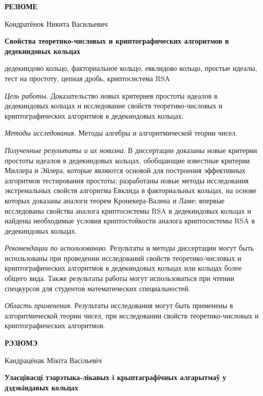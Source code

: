 \documentclass[_00_autoref.tex]{subfiles}
\begin{document}
\newpage
\centerline{\textbf{РЕЗЮМЕ}}

\vspace{-0.3ex}
\begin{center}
Кондратёнок Никита Васильевич

\textbf{Свойства теоретико-числовых и криптографических алгоритмов в дедекиндовых кольцах}
\end{center}
\vspace{-0.3ex}

\noindent
дедекиндово кольцо, факториальное кольцо, евклидово кольцо, простые идеалы, тест на простоту, цепная дробь, криптосистема RSA

\textit{Цель работы}.
Доказательство новых критериев простоты идеалов в дедекиндовых кольцах и исследование свойств теоретико-числовых и криптографических алгоритмов в дедекиндовых кольцах.

\textit{Методы исследования}.
Методы алгебры и алгоритмической теории чисел.

\textit{Полученные результаты и их новизна}.
В диссертации доказаны новые критерии простоты идеалов в дедекиндовых кольцах, обобщающие известные критерии Миллера и Эйлера, которые являются основой для построения эффективных алгоритмов тестирования простоты; разработаны новые методы исследования экстремальных свойств алгоритма Евклида в факториальных кольцах, на основе которых доказаны аналоги теорем Кронекера-Валена и Ламе; впервые исследованы свойства аналога криптосистемы RSA в дедекиндовых кольцах и найдены необходимые условия криптостойкости аналога криптосистемы RSA в дедекиндовых кольцах.

\textit{Рекомендации по использованию}.
Результаты и методы диссертации могут быть использованы при проведении исследований свойств теоретико-числовых и криптографических алгоритмов в дедекиндовых кольцах или кольцах более общего вида.
Также результаты работы могут использоваться при чтении спецкурсов для студентов математических специальностей.

\textit{Область применения}.
Результаты исследования могут быть применены в алгоритмической теории чисел, при исследовании свойств теоретико-числовых и криптографических алгоритмов.

\newpage
\centerline{\textbf{РЭЗЮМЭ}}

\vspace{-0.3ex}
\begin{center}
Кандрацёнак Мікіта Васільевіч

\textbf{Уласцівасці тэарэтыка-лікавых і крыптаграфічных алгарытмаў у дэдэкіндавых кольцах}
\end{center}
\vspace{-0.3ex}
\end{document}
